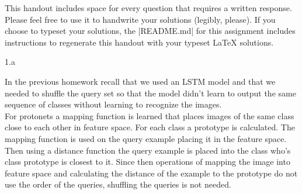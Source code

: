 

\def\assignmentnum{3 }
\def\assignmenttitle{XCS330 Problem Set \assignmentnum}


\pagestyle{myheadings} \markboth{}{\assignmenttitle}


This handout includes space for every question that requires a written response.
Please feel free to use it to handwrite your solutions (legibly, please).  If
you choose to typeset your solutions, the |README.md| for this assignment includes
instructions to regenerate this handout with your typeset \LaTeX{} solutions.

\LARGE
1.a
\normalsize

\begin{answer}
    In the previous homework recall that we used an LSTM model and that we needed to shuffle the query set so that the model didn't learn to output the same sequence of classes without learning to recognize the images.\\ 
	For protonets a mapping function is learned that places images of the same class close to each other in feature space. 
	For each class a prototype is calculated. The mapping function is used on the query example placing it in the feature space. 
	Then using a distance function the query example is placed into the class who's class prototype is closest to it. 
	Since then operations of mapping the image into feature space and calculating the distance of the example to the prototype do not use the order of the queries, shuffling the queries is not needed. 
\end{answer}

